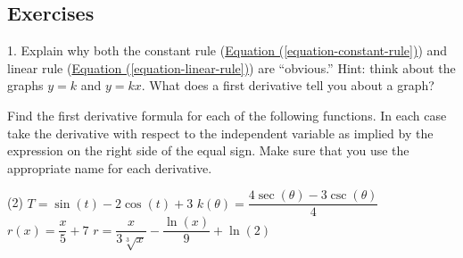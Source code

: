 \documentclass[10pt,oneside,]{book}
\theoremstyle{plain}
\theoremstyle{definition}
\numberwithin{equation}{section}
\newcommand{\fe}[2]{#1\mathopen{}\left(#2\right)\mathclose{}}
\begin{document}
\subsection[Exercises]{Exercises}\label{exercises-36}
\begin{exerciselist}
\item[1.]\hypertarget{exercise-366}{\null}Explain why both the constant rule (\hyperref[equation-constant-rule]{Equation (\ref{equation-constant-rule})}) and linear rule (\hyperref[equation-linear-rule]{Equation (\ref{equation-linear-rule})}) are ``obvious.'' Hint: think about the graphs \(y=k\) and \(y=kx\).  What does a first derivative tell you about a graph?%
\par\smallskip
\end{exerciselist}
\hypertarget{exercisegroup-75}{\null}Find the first derivative formula for each of the following functions.  In each case take the derivative with respect to the independent variable as implied by the expression on the right side of the equal sign.  Make sure that you use the appropriate name for each derivative.%
\par
\begin{exercisegroup}(2)
\exercise[2.]\hypertarget{exercise-367}{\null}\(T=\fe{\sin}{t}-2\fe{\cos}{t}+3\)%
\exercise[3.]\hypertarget{exercise-368}{\null}\(\fe{k}{\theta}=\dfrac{4\fe{\sec}{\theta}-3\fe{\csc}{\theta}}{4}\)%
\exercise[4.]\hypertarget{exercise-369}{\null}\(\fe{r}{x}=\dfrac{x}{5}+7\)%
\exercise[5.]\hypertarget{exercise-370}{\null}\(r=\dfrac{x}{3\sqrt[3]{x}}-\dfrac{\fe{\ln}{x}}{9}+\fe{\ln}{2}\)%
\end{exercisegroup}
\par\smallskip\noindent
\typeout{************************************************}
\typeout{************************************************}
\end{document}
